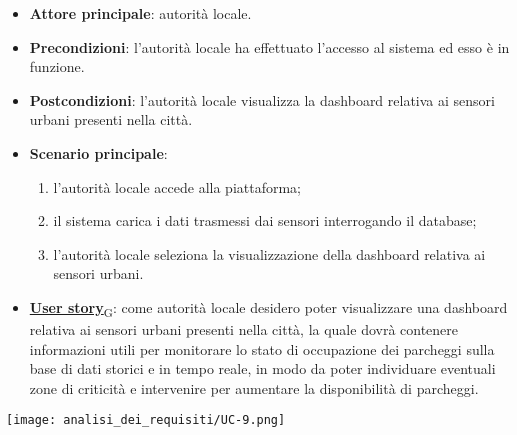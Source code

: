 \begin{itemize}
	\item \textbf{Attore principale}: autorità locale.
	\item \textbf{Precondizioni}: l'autorità locale ha effettuato l'accesso al sistema ed esso è in funzione.
	\item \textbf{Postcondizioni}: l'autorità locale visualizza la dashboard relativa
	      ai sensori urbani presenti nella città.
	\item \textbf{Scenario principale}:
	      \begin{enumerate}
		      \item l'autorità locale accede alla piattaforma;
		      \item il sistema carica i dati trasmessi dai sensori interrogando il database;
		      \item l'autorità locale seleziona la visualizzazione della dashboard relativa ai sensori urbani.
	      \end{enumerate}
	\item \href{https://7last.github.io/docs/rtb/documentazione-interna/glossario\#user-story}{\textbf{User story}\textsubscript{G}}:
	      come autorità locale desidero poter visualizzare una dashboard relativa ai sensori urbani presenti nella città, la quale
	      dovrà contenere informazioni utili per monitorare lo stato di occupazione dei parcheggi sulla base di dati storici e in tempo reale,
	      in modo da poter individuare eventuali zone di criticità e intervenire per aumentare la disponibilità di parcheggi.
\end{itemize}
\begin{center}
	\texttt{[image: analisi\_dei\_requisiti/UC-9.png]}
\end{center}


